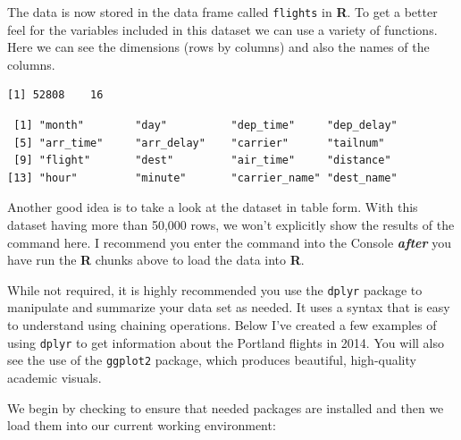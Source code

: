 \documentclass[12pt,twoside]{reedthesis}
\theoremstyle{definition}
\theoremstyle{definition}
\theoremstyle{definition}
\theoremstyle{remark}
\begin{document}
The data is now stored in the data frame called \texttt{flights} in
\textbf{R}. To get a better feel for the variables included in this
dataset we can use a variety of functions. Here we can see the
dimensions (rows by columns) and also the names of the columns.
\begin{verbatim}
[1] 52808    16
\end{verbatim}
\begin{verbatim}
 [1] "month"        "day"          "dep_time"     "dep_delay"   
 [5] "arr_time"     "arr_delay"    "carrier"      "tailnum"     
 [9] "flight"       "dest"         "air_time"     "distance"    
[13] "hour"         "minute"       "carrier_name" "dest_name"   
\end{verbatim}
Another good idea is to take a look at the dataset in table form. With
this dataset having more than 50,000 rows, we won't explicitly show the
results of the command here. I recommend you enter the command into the
Console \textbf{\emph{after}} you have run the \textbf{R} chunks above
to load the data into \textbf{R}.

While not required, it is highly recommended you use the \texttt{dplyr}
package to manipulate and summarize your data set as needed. It uses a
syntax that is easy to understand using chaining operations. Below I've
created a few examples of using \texttt{dplyr} to get information about
the Portland flights in 2014. You will also see the use of the
\texttt{ggplot2} package, which produces beautiful, high-quality
academic visuals.

We begin by checking to ensure that needed packages are installed and
then we load them into our current working environment:

\clearpage
\end{document}
